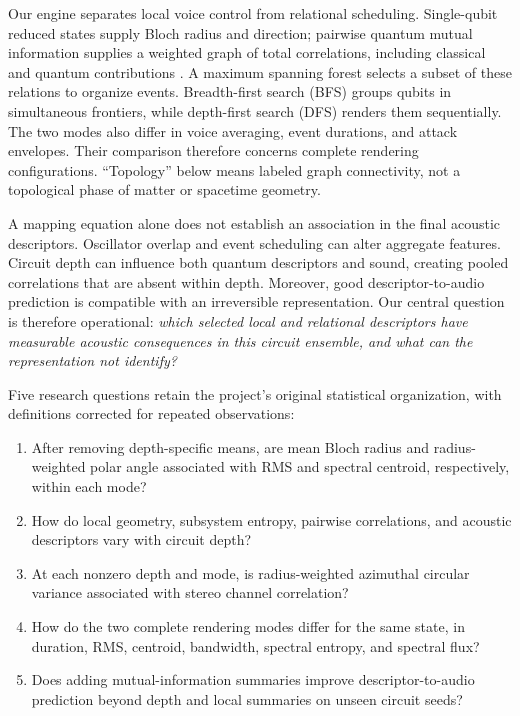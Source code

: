 \documentclass[pdflatex,iicol,sn-basic,Numbered]{sn-jnl}
\begin{document}
\enlargethispage{3pt}
Our engine separates local voice control from relational scheduling. Single-qubit reduced states supply Bloch radius and direction; pairwise quantum mutual information supplies a weighted graph of total correlations, including classical and quantum contributions \citep{Groisman2005}. A maximum spanning forest selects a subset of these relations to organize events. Breadth-first search (BFS) groups qubits in simultaneous frontiers, while depth-first search (DFS) renders them sequentially. The two modes also differ in voice averaging, event durations, and attack envelopes. Their comparison therefore concerns complete rendering configurations. ``Topology'' below means labeled graph connectivity, not a topological phase of matter or spacetime geometry.

A mapping equation alone does not establish an association in the final acoustic descriptors. Oscillator overlap and event scheduling can alter aggregate features. Circuit depth can influence both quantum descriptors and sound, creating pooled correlations that are absent within depth. Moreover, good descriptor-to-audio prediction is compatible with an irreversible representation. Our central question is therefore operational: \emph{which selected local and relational descriptors have measurable acoustic consequences in this circuit ensemble, and what can the representation not identify?}

Five research questions retain the project's original statistical organization, with definitions corrected for repeated observations:
\begin{enumerate}
\item[\textbf{RQ1.}] After removing depth-specific means, are mean Bloch radius and radius-weighted polar angle associated with RMS and spectral centroid, respectively, within each mode?
\item[\textbf{RQ2.}] How do local geometry, subsystem entropy, pairwise correlations, and acoustic descriptors vary with circuit depth?
\item[\textbf{RQ3.}] At each nonzero depth and mode, is radius-weighted azimuthal circular variance associated with stereo channel correlation?
\item[\textbf{RQ4.}] How do the two complete rendering modes differ for the same state, in duration, RMS, centroid, bandwidth, spectral entropy, and spectral flux?
\item[\textbf{RQ5.}] Does adding mutual-information summaries improve descriptor-to-audio prediction beyond depth and local summaries on unseen circuit seeds?
\end{enumerate}
\end{document}
